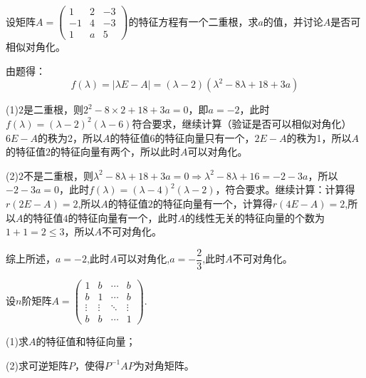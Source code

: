 \documentclass[a4paper]{report}
\begin{document}
\EX 设矩阵$A=
\begin{pmatrix}
1&2&-3\\-1&4&-3\\1&a&5
\end{pmatrix}
$的特征方程有一个二重根，求$a$的值，并讨论$A$是否可相似对角化。

\begin{jie}
由题得：
\begin{equation*}
f(\lambda)=|\lambda E-A|=(\lambda-2)(\lambda^2-8\lambda+18+3a)
\end{equation*}

(1)$2$是二重根，则$2^2-8\times 2+18+3a=0$，即$a=-2$，此时$f(\lambda)=(\lambda-2)^2(\lambda-6)$符合要求，继续计算（验证是否可以相似对角化）$6E-A$的秩为2，所以$A$的特征值$6$的特征向量只有一个，$2E-A$的秩为1，所以$A$的特征值$2$的特征向量有两个，所以此时$A$可以对角化。

(2)$2$不是二重根，则$\lambda^2-8\lambda+18+3a=0\Rightarrow
\lambda^2-8\lambda+16=-2-3a
$，所以$-2-3a=0$，此时$f(\lambda)=(\lambda-4)^2(\lambda-2)$，符合要求。继续计算：计算得$r(2E-A)=2$,所以$A$的特征值$2$的特征向量有一个，计算得$r(4E-A)=2$,所以$A$的特征值$4$的特征向量有一个，此时$A$的线性无关的特征向量的个数为$1+1=2\leq 3$，所以$A$不可对角化。

综上所述，$a=-2$,此时$A$可以对角化,$a=-\dfrac{2}{3}$,此时$A$不可对角化。
\end{jie}

\EX 设$n$阶矩阵$
A=
\begin{pmatrix}
1&b&\cdots&b\\
b&1&\cdots&b\\
\vdots&\vdots&\ddots&\vdots\\
b&b&\cdots&1
\end{pmatrix}
$.

(1)求$A$的特征值和特征向量；

(2)求可逆矩阵$P$，使得$P^{-1}AP$为对角矩阵。
\end{document}
